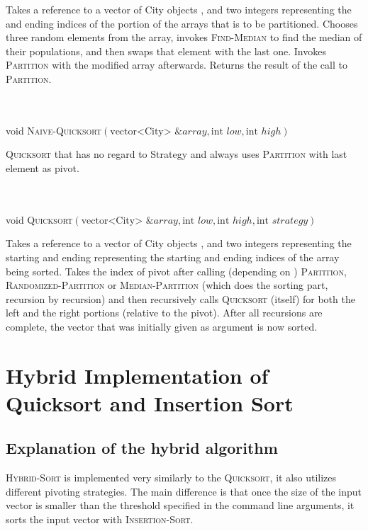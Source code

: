 \begin{indent}
    Takes a reference to a vector of City objects , and two integers representing the  and ending  indices of the portion of the arrays that is to be partitioned. Chooses three random elements from the array, invokes \textsc{Find-Median} to find the median of their populations, and then swaps that element with the last one. Invokes \textsc{Partition} with the modified array afterwards. Returns the result of the call to \textsc{Partition}.
\end{indent}
\\ 
\\
\noindent void \textsc{Naive-Quicksort}$(\text{vector<City> \&} array, \text{int } low, \text{int }high)$\\
\begin{indent}
\textsc{Quicksort} that has no regard to Strategy and always uses \textsc{Partition} with last element as pivot.
\end{indent}
\\
\\
\noindent void \textsc{Quicksort}$(\text{vector<City> \&} array, \text{int } low, \text{int }high, \text{int }strategy)$\\
\begin{indent}
Takes a reference to a vector of City objects , and two integers representing the starting and ending representing the starting  and ending  indices of the array being sorted. Takes the index of pivot after calling (depending on ) \textsc{Partition}, \textsc{Randomized-Partition} or \textsc{Median-Partition} (which does the sorting part, recursion by recursion) and then recursively calls \textsc{Quicksort} (itself) for both the left and the right portions (relative to the pivot). After all recursions are complete, the vector that was initially given as argument is now sorted. 
\end{indent}
\section{Hybrid Implementation of Quicksort and Insertion Sort}

\subsection{Explanation of the hybrid algorithm}
\textsc{Hybrid-Sort} is implemented very similarly to the \textsc{Quicksort}, it also utilizes different pivoting strategies. The main difference is that once the size of the input vector is smaller than the threshold specified in the command line arguments, it sorts the input vector with \textsc{Insertion-Sort}.
